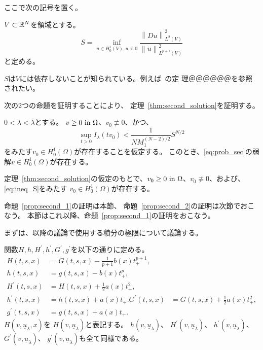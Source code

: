 ここで次の記号を置く。

\begin{nota} \label{nota:S_def}
 $V \subset \mathbb{R}^N$を領域とする。
 \begin{equation}
  S = \inf_{u \in H^1_0(V), u \not \equiv 0}
 \frac{\left\| Du \right\|_{L^2(V)}^2}{\left\| u
                                       \right\|_{L^{p+1}(V)}^2}  
 \label{eq:S_def}
 \end{equation}
 と定める。
\end{nota}

$S$は$V$には依存しないことが知られている。例えば~\cite{田中200808}の定
理＠＠＠＠＠＠を参照されたい。

次の2つの命題を証明することにより、
定理~\ref{thm:second_solution}を証明する。

\begin{prop} \label{prop:second_1}
 $0 < \lambda < \bar{\lambda}$とする。
 $v \geq 0 ~\text{in}~ \Omega$、$v_0 \not \equiv 0$、かつ、
 \begin{equation}
  \sup_{t > 0} I_\lambda (tv_0) < \frac{1}{NM_1^{(N-2)/2}} S^{N/2} 
   \label{eq:ineq_S}
 \end{equation}
 をみたす$v_0 \in H_0^1(\Omega)$が存在することを仮定する。
 このとき、\ref{eq:prob_sec}の弱解$v \in H_0^1(\Omega)$が存在する。
\end{prop}

\begin{prop} \label{prop:second_2}
 定理~\ref{thm:second_solution}の仮定のもとで、$v_0 \geq 0 ~\text{in}~
 \Omega$、$v_0 \not \equiv 0$、および、\eqref{eq:ineq_S}をみたす
 $v_0 \in H_0^1(\Omega)$が存在する。
\end{prop}

命題~\ref{prop:second_1}の証明は本節、
命題~\ref{prop:second_2}の証明は次節でおこなう。
本節はこれ以降、命題~\ref{prop:second_1}の証明をおこなう。

まずは、以降の議論で使用する積分の極限について議論する。

\begin{nota}
 関数$H, h, H^\prime, h^\prime, G^\prime, g^\prime$を以下の通りに定める。
 \begin{align*}
  H(t, s, x) &= G(t, s, x) - \frac{1}{p+1}b(x) t_+ ^{p+1}, \\
  h(t, s, x) &= g(t, s, x) - b(x) t_+ ^{p}, \\
  H^\prime (t, s, x) &= H(t, s, x) + \frac{1}{2}a(x) t_+^2, \\
  h^\prime (t, s, x) &= h(t, s, x) + a(x) t_+.
  G^\prime (t, s, x) &= G(t, s, x) + \frac{1}{2}a(x) t_+^2, \\
  g^\prime (t, s, x) &= g(t, s, x) + a(x) t_+.
 \end{align*}
 $H(v, \underline{u}_\lambda, x)$を
 $H(v, \underline{u}_\lambda)$と表記する。
 $h(v, \underline{u}_\lambda)$、
 $H^\prime(v, \underline{u}_\lambda)$、
 $h^\prime(v, \underline{u}_\lambda)$、
 $G^\prime(v, \underline{u}_\lambda)$、
 $g^\prime(v, \underline{u}_\lambda)$も全て同様である。
\end{nota}

